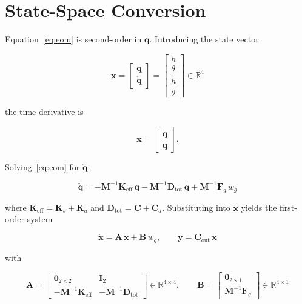 \documentclass[11pt, a4paper]{article}
\begin{document}
\section*{State-Space Conversion}

Equation~\eqref{eq:eom} is second-order in $\mathbf{q}$.
Introducing the state vector

\begin{equation}
  \mathbf{x} =
  \begin{bmatrix} \mathbf{q} \\ \dot{\mathbf{q}} \end{bmatrix}
  = \begin{bmatrix} h \\ \theta \\ \dot{h} \\ \dot{\theta} \end{bmatrix}
  \in \mathbb{R}^4
\end{equation}

the time derivative is

\begin{equation}
  \dot{\mathbf{x}} =
  \begin{bmatrix} \dot{\mathbf{q}} \\ \ddot{\mathbf{q}} \end{bmatrix}.
\end{equation}

Solving~\eqref{eq:eom} for $\ddot{\mathbf{q}}$:

\begin{equation}
  \ddot{\mathbf{q}}
  = -\mathbf{M}^{-1}\mathbf{K}_{\text{eff}}\,\mathbf{q}
    -\mathbf{M}^{-1}\mathbf{D}_{\text{tot}}\,\dot{\mathbf{q}}
    +\mathbf{M}^{-1}\mathbf{F}_g\,w_g
\end{equation}

where $\mathbf{K}_{\text{eff}} = \mathbf{K}_s + \mathbf{K}_a$ and
$\mathbf{D}_{\text{tot}} = \mathbf{C} + \mathbf{C}_a$.
Substituting into $\dot{\mathbf{x}}$ yields the first-order system

\begin{equation}
  \boxed{
  \dot{\mathbf{x}} = \mathbf{A}\,\mathbf{x} + \mathbf{B}\,w_g,
  \qquad
  \mathbf{y} = \mathbf{C}_{\text{out}}\,\mathbf{x}
  }
\end{equation}

with

\begin{equation}
  \mathbf{A} =
  \begin{bmatrix}
    \mathbf{0}_{2\times2} & \mathbf{I}_2 \\[4pt]
    -\mathbf{M}^{-1}\mathbf{K}_{\text{eff}} &
    -\mathbf{M}^{-1}\mathbf{D}_{\text{tot}}
  \end{bmatrix}
  \in\mathbb{R}^{4\times4},
  \qquad
  \mathbf{B} =
  \begin{bmatrix} \mathbf{0}_{2\times1} \\[4pt]
                  \mathbf{M}^{-1}\mathbf{F}_g \end{bmatrix}
  \in\mathbb{R}^{4\times1}
\end{equation}
\end{document}
